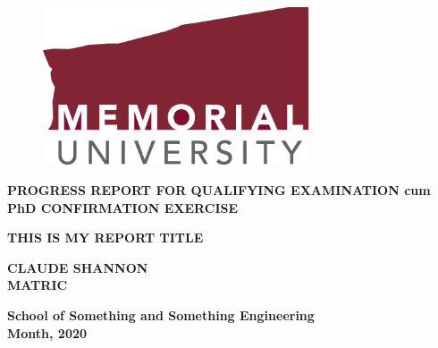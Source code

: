 

\begin{titlepage}
   \begin{center}
   \begin{doublespacing}

       \begin{figure}
       \centering
       \includegraphics[width=0.7\textwidth]{images/MUN_Logo_RGB.png}
       \end{figure}
       
       
       \vspace*{5mm}
       {\large\textbf{PROGRESS REPORT FOR QUALIFYING EXAMINATION cum PhD CONFIRMATION EXERCISE}}

       \vspace{30mm}
       
       {\Large\textbf{THIS IS MY REPORT TITLE}}

    
            
       \vspace{30mm}

       {\Large\textbf{CLAUDE SHANNON}\\
       \textbf{MATRIC}}

       \vfill
       {\large \textbf{School of Something and Something Engineering}\\
       \textbf{Month, 2020}}
       
    \end{doublespacing}

   \end{center}
\end{titlepage}

